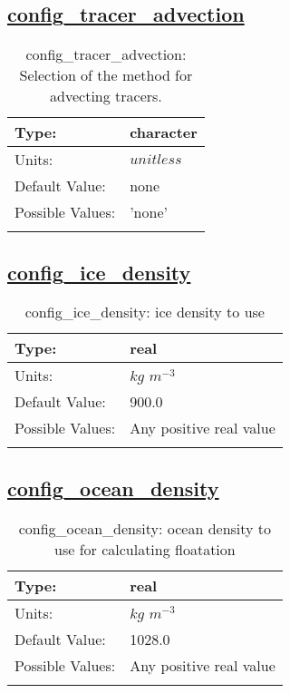 \subsection[config\_tracer\_advection]{\hyperref[sec:nm_tab_li_model]{config\_tracer\_advection}}
\label{subsec:nm_sec_config_tracer_advection}
\begin{center}
\begin{longtable}{| p{2.0in} | p{4.0in} |}
    \hline
    Type: & character \\
    \hline
    Units: & $unitless$ \\
    \hline
    Default Value: & none \\
    \hline
    Possible Values: & 'none' \\
    \hline
    \caption{config\_tracer\_advection: Selection of the method for advecting tracers.}
\end{longtable}
\end{center}
\subsection[config\_ice\_density]{\hyperref[sec:nm_tab_li_model]{config\_ice\_density}}
\label{subsec:nm_sec_config_ice_density}
\begin{center}
\begin{longtable}{| p{2.0in} | p{4.0in} |}
    \hline
    Type: & real \\
    \hline
    Units: & $kg$ $m^{-3}$ \\
    \hline
    Default Value: & 900.0 \\
    \hline
    Possible Values: & Any positive real value \\
    \hline
    \caption{config\_ice\_density: ice density to use}
\end{longtable}
\end{center}
\subsection[config\_ocean\_density]{\hyperref[sec:nm_tab_li_model]{config\_ocean\_density}}
\label{subsec:nm_sec_config_ocean_density}
\begin{center}
\begin{longtable}{| p{2.0in} | p{4.0in} |}
    \hline
    Type: & real \\
    \hline
    Units: & $kg$ $m^{-3}$ \\
    \hline
    Default Value: & 1028.0 \\
    \hline
    Possible Values: & Any positive real value \\
    \hline
    \caption{config\_ocean\_density: ocean density to use for calculating floatation}
\end{longtable}
\end{center}
